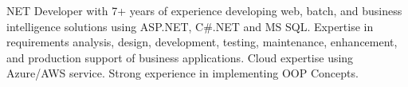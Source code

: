 

\begin{cvparagraph}

NET Developer with 7+ years of experience developing web, batch, and business intelligence solutions using ASP.NET, C\#.NET and MS SQL. Expertise in requirements analysis, design, development, testing, maintenance, enhancement, and production support of business applications. Cloud expertise using Azure/AWS service. Strong experience in implementing OOP Concepts.
\end{cvparagraph}
